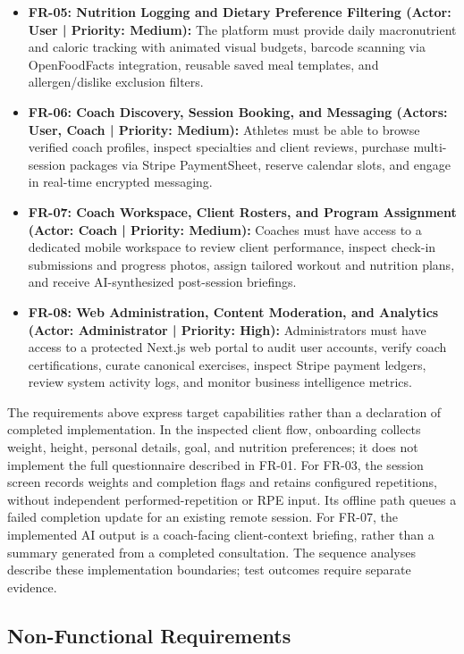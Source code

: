 \documentclass[12pt,a4paper,openany]{report}
\begin{document}
\begin{itemize}
    \item \textbf{FR-05: Nutrition Logging and Dietary Preference Filtering (Actor: User | Priority: Medium):} The platform must provide daily macronutrient and caloric tracking with animated visual budgets, barcode scanning via OpenFoodFacts integration, reusable saved meal templates, and allergen/dislike exclusion filters.
    \item \textbf{FR-06: Coach Discovery, Session Booking, and Messaging (Actors: User, Coach | Priority: Medium):} Athletes must be able to browse verified coach profiles, inspect specialties and client reviews, purchase multi-session packages via Stripe PaymentSheet, reserve calendar slots, and engage in real-time encrypted messaging.
    \item \textbf{FR-07: Coach Workspace, Client Rosters, and Program Assignment (Actor: Coach | Priority: Medium):} Coaches must have access to a dedicated mobile workspace to review client performance, inspect check-in submissions and progress photos, assign tailored workout and nutrition plans, and receive AI-synthesized post-session briefings.
    \item \textbf{FR-08: Web Administration, Content Moderation, and Analytics (Actor: Administrator | Priority: High):} Administrators must have access to a protected Next.js web portal to audit user accounts, verify coach certifications, curate canonical exercises, inspect Stripe payment ledgers, review system activity logs, and monitor business intelligence metrics.
\end{itemize}

The requirements above express target capabilities rather than a declaration of completed implementation. In the inspected client flow, onboarding collects weight, height, personal details, goal, and nutrition preferences; it does not implement the full questionnaire described in FR-01. For FR-03, the session screen records weights and completion flags and retains configured repetitions, without independent performed-repetition or RPE input. Its offline path queues a failed completion update for an existing remote session. For FR-07, the implemented AI output is a coach-facing client-context briefing, rather than a summary generated from a completed consultation. The sequence analyses describe these implementation boundaries; test outcomes require separate evidence.

\subsection{Non-Functional Requirements}
\end{document}
